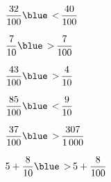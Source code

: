    \begin{colenumerate}{2}
      \item $\dfrac{32}{100} {\blue\,<\,} \dfrac{40}{100}$ \medskip
      \item $\dfrac{7}{10} {\blue\,>\,} \dfrac{7}{100}$ \medskip
      \item $\dfrac{43}{100} {\blue\,>\,} \dfrac{4}{10}$ \medskip
      \item $\dfrac{85}{100} {\blue\,<\,} \dfrac{9}{10}$
      \item $\dfrac{37}{100} {\blue\,>\,} \dfrac{307}{1\,000}$
      \item $5+\dfrac{8}{10} {\blue\,>\,} 5+\dfrac{8}{100}$
   \end{colenumerate}
